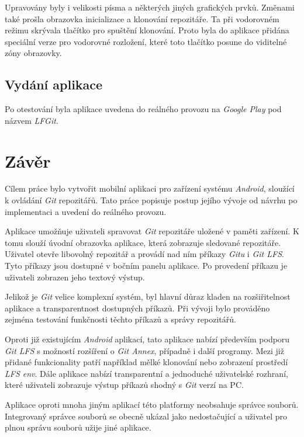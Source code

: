 Upravovány byly i velikosti písma a některých jiných grafických prvků. Změnami také prošla obrazovka inicializace a klonování repozitáře. Ta při vodorovném režimu skrývala tlačítko pro spuštění klonování. Proto byla do aplikace přidána speciální verze pro vodorovné rozložení, které toto tlačítko posune do viditelné zóny obrazovky.

\section{Vydání aplikace}
Po otestování byla aplikace uvedena do reálného provozu na \emph{Google Play} pod názvem \emph{LFGit}.

\chapter{Závěr}
Cílem práce bylo vytvořit mobilní aplikaci pro zařízení systému \emph{Android}, sloužící k ovládání \emph{Git} repozitářů. Tato práce popisuje postup jejího vývoje od návrhu po implementaci a uvedení do reálného provozu.

Aplikace umožňuje uživateli spravovat \emph{Git} repozitáře uložené v paměti zařízení. K tomu slouží úvodní obrazovka aplikace, která zobrazuje sledované repozitáře. Uživatel otevře libovolný repozitář a provádí nad ním příkazy \emph{Gitu} i \emph{Git LFS}. Tyto příkazy jsou dostupné v bočním panelu aplikace. Po provedení příkazu je uživateli zobrazen jeho textový výstup.

Jelikož je \emph{Git} velice komplexní systém, byl hlavní důraz kladen na rozšiřitelnost aplikace a transparentnost dostupných příkazů. Při vývoji bylo prováděno zejména testování funkčnosti těchto příkazů a správy repozitářů.

Oproti již existujícím \emph{Android} aplikací, tato aplikace nabízí především podporu \emph{Git LFS} s možností rozšíření o \emph{Git Annex}, případně i další programy. Mezi již přidané funkcionality patří například mělké klonování nebo zobrazení prostředí \emph{LFS env}. Dále aplikace nabízí transparentní a jednoduché uživatelské rozhraní, které uživateli zobrazuje výstup příkazů shodný s \emph{Git} verzí na PC.

Aplikace oproti mnoha jiným aplikací této platformy neobsahuje správce souborů. Integrovaný správce souborů se obecně ukázal jako nedostačující a uživatel pro plnou správu souborů užije jiné aplikace.

